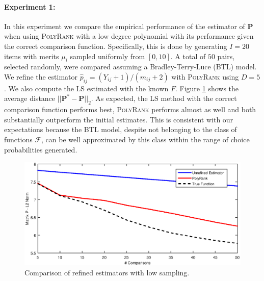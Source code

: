 \documentclass[twoside,11pt]{article}
\begin{document}
\paragraph{Experiment 1:}  In this experiment we compare  the empirical performance of the estimator of $\boldsymbol{P}$ when using \textsc{PolyRank} with a low degree polynomial with its performance given the correct comparison function. Specifically, this is done by generating $I = 20$ items with merits $\mu_i$ sampled uniformly from $ [0, 10]$. A total of $50$ pairs, selected randomly, were compared assuming a Bradley-Terry-Luce (BTL) model. We refine the estimator $\hat{p}_{ij} = (Y_{ij}+1)/(m_{ij}+2)$ with \textsc{PolyRank} using $D=5$. We also compute the LS estimated with the known $F$.  Figure \ref{fig_refinement_comparisons} shows the  average distance $||\boldsymbol{P}^* - \boldsymbol{P}||_2$. As expected, the LS method with the correct comparison function performs best, \textsc{PolyRank} performs almost as well and both substantially outperform the initial estimates.  This is consistent with our expectations because the BTL model, despite not belonging to the class of functions $\mathcal{F}$, can be well approximated by this class within the range of choice probabilities generated.  
\begin{figure}
  \centering
    \includegraphics[width=1\textwidth]{refinement_comparisons.eps}
    \caption{Comparison of refined estimators with low sampling. \label{fig_refinement_comparisons}}
\end{figure}

\end{document}
